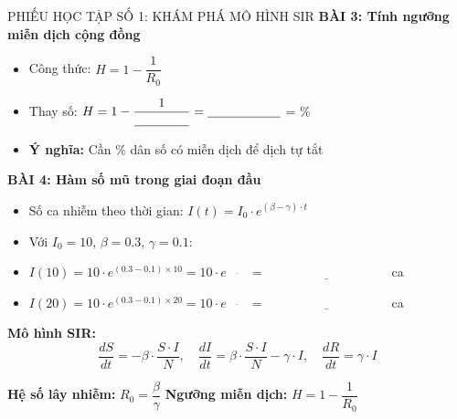 \documentclass[12pt,a4paper]{article}
\begin{document}
\begin{phieuhoctap}{PHIẾU HỌC TẬP SỐ 1: KHÁM PHÁ MÔ HÌNH SIR}
\vspace{0.5cm}
\textbf{\color{accent}BÀI 3: Tính ngưỡng miễn dịch cộng đồng}
\begin{itemize}
\item Công thức: $H = 1 - \dfrac{1}{R_0}$
\item Thay số: $H = 1 - \dfrac{1}{\underline{\hspace{1.5cm}}} = \underline{\hspace{2cm}}$ = \underline{\hspace{2cm}}\%
\item \textbf{Ý nghĩa:} Cần \underline{\hspace{2cm}}\% dân số có miễn dịch để dịch tự tắt
\end{itemize}

\vspace{0.5cm}
\textbf{\color{accent}BÀI 4: Hàm số mũ trong giai đoạn đầu}
\begin{itemize}
\item Số ca nhiễm theo thời gian: $I(t) = I_0 \cdot e^{(\beta - \gamma) \cdot t}$
\item Với $I_0 = 10$, $\beta = 0.3$, $\gamma = 0.1$:
\item $I(10) = 10 \cdot e^{(0.3 - 0.1) \times 10} = 10 \cdot e^{\underline{\hspace{1cm}}} = \underline{\hspace{4cm}}$ ca
\item $I(20) = 10 \cdot e^{(0.3 - 0.1) \times 20} = 10 \cdot e^{\underline{\hspace{1cm}}} = \underline{\hspace{4cm}}$ ca
\end{itemize}

\begin{congthuc}
\textbf{Mô hình SIR:}
$$\frac{dS}{dt} = -\beta \cdot \frac{S \cdot I}{N}, \quad \frac{dI}{dt} = \beta \cdot \frac{S \cdot I}{N} - \gamma \cdot I, \quad \frac{dR}{dt} = \gamma \cdot I$$

\textbf{Hệ số lây nhiễm:} $R_0 = \dfrac{\beta}{\gamma}$ \hspace{2cm} \textbf{Ngưỡng miễn dịch:} $H = 1 - \dfrac{1}{R_0}$
\end{congthuc}
\end{phieuhoctap}
\end{document}
